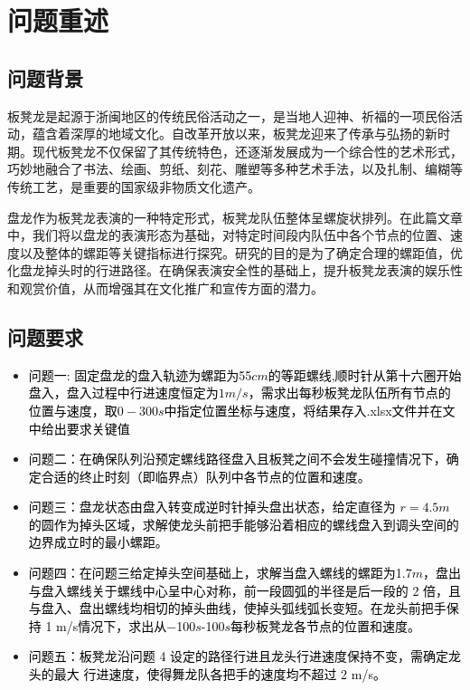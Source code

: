 \documentclass[withoutpreface,bwprint]{cumcmthesis}
\begin{document}
\section{问题重述}
\subsection{问题背景}
板凳龙是起源于浙闽地区的传统民俗活动之一，是当地人迎神、祈福的一项民俗活动，蕴含着深厚的地域文化。自改革开放以来，板凳龙迎来了传承与弘扬的新时期。现代板凳龙不仅保留了其传统特色，还逐渐发展成为一个综合性的艺术形式，巧妙地融合了书法、绘画、剪纸、刻花、雕塑等多种艺术手法，以及扎制、编糊等传统工艺，是重要的国家级非物质文化遗产。

盘龙作为板凳龙表演的一种特定形式，板凳龙队伍整体呈螺旋状排列。在此篇文章中，我们将以盘龙的表演形态为基础，对特定时间段内队伍中各个节点的位置、速度以及整体的螺距等关键指标进行探究。研究的目的是为了确定合理的螺距值，优化盘龙掉头时的行进路径。在确保表演安全性的基础上，提升板凳龙表演的娱乐性和观赏价值，从而增强其在文化推广和宣传方面的潜力。
%	
%
\subsection{问题要求}
\begin{itemize}
  \item \textcolor{black}{问题一: 固定盘龙的盘入轨迹为螺距为55$cm$的等距螺线,顺时针从第十六圈开始盘入，盘入过程中行进速度恒定为$1m/s$，需求出每秒板凳龙队伍所有节点的位置与速度，取$0-300s$中指定位置坐标与速度，将结果存入.xlsx文件并在文中给出要求关键值}
  \item \textcolor{black}{问题二：在确保队列沿预定螺线路径盘入且板凳之间不会发生碰撞情况下，确定合适的终止时刻（即临界点）队列中各节点的位置和速度。}
  \item \textcolor{black}{问题三：盘龙状态由盘入转变成逆时针掉头盘出状态，给定直径为 $r = 4.5m$ 的圆作为掉头区域，求解使龙头前把手能够沿着相应的螺线盘入到调头空间的边界成立时的最小螺距。}
  \item \textcolor{black}{问题四：在问题三给定掉头空间基础上，求解当盘入螺线的螺距为1.7$m$，盘出与盘入螺线关于螺线中心呈中心对称，前一段圆弧的半径是后一段的 2 倍，且与盘入、盘出螺线均相切的掉头曲线，使掉头弧线弧长变短。在龙头前把手保持 1 m/s情况下，求出从−100$s$-100$s$每秒板凳龙各节点的位置和速度。}
  \item \textcolor{black}{问题五：板凳龙沿问题 4 设定的路径行进且龙头行进速度保持不变，需确定龙头的最大
  	行进速度，使得舞龙队各把手的速度均不超过 2 m/s。}
\end{itemize}
\end{document}
